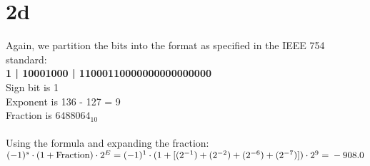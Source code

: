 \documentclass[10pt,a4paper]{article}
\begin{document}
	\section*{2d}
	Again, we partition the bits into the format as specified in the IEEE 754 standard: \\
	\textbf{1 | 10001000 | 11000110000000000000000} \\
	Sign bit is 1 \\
	Exponent is 136 - 127 = 9\\
	Fraction is $6488064_{10}$ \\\\
	Using the formula and expanding the fraction: \\ $(-1)^s \cdot (1 + \text{Fraction}) \cdot 2^E = \\ (-1)^1 \cdot (1 + [(2^{-1}) + (2^{-2}) + (2^{-6}) + (2^{-7})]) \cdot 2^{9} = \\ -908.0$
	
\end{document}
